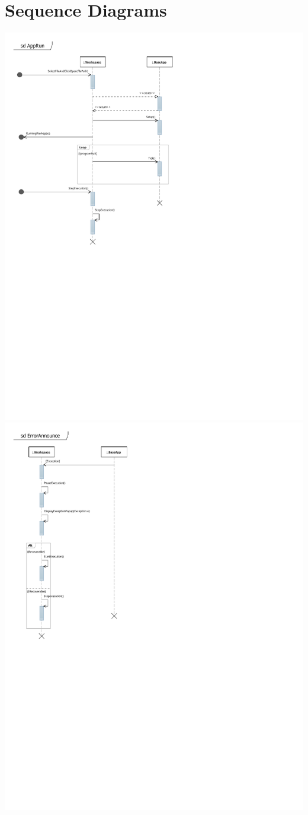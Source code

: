\documentclass[12pt]{article}
\begin{document}
\section{Sequence Diagrams}
\begin{center}
        \includegraphics{./pdfs/Models/SD - AppRun.pdf}
        \includegraphics{./pdfs/Models/SD - ErrorAnnounce.pdf}
\end{center}
        
\end{document}
